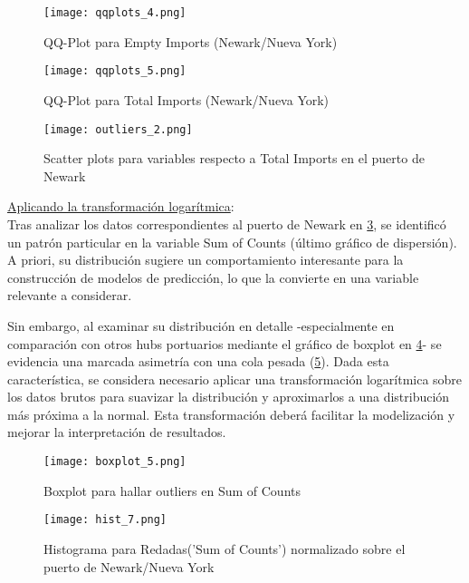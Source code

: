 \documentclass[12pt]{article}
\begin{document}
		\begin{figure}[H]
			\caption{\label{qqplots_4} QQ-Plot para Empty Imports (Newark/Nueva York)}
			\centering
			\hspace*{1cm}
			\texttt{[image: qqplots\_4.png]}
		\end{figure}
	
		\begin{figure}[H]
			\caption{\label{qqplots_5} QQ-Plot para Total Imports (Newark/Nueva York)}
			\centering
			\hspace*{1cm}
			\texttt{[image: qqplots\_5.png]}
		\end{figure}
	
		\begin{figure}[H]
			\caption{\label{outliers_2} Scatter plots para variables respecto a Total Imports en el puerto de Newark}
			\centering
			\hspace*{1cm}
			\texttt{[image: outliers\_2.png]}
		\end{figure}
	
		\underline{Aplicando la transformación logarítmica}:\\
		Tras analizar los datos correspondientes al puerto de Newark en \ref{outliers_2}, se identificó un patrón particular en la variable Sum of Counts (último gráfico de dispersión).
		A priori, su distribución sugiere un comportamiento interesante para la construcción de modelos de predicción, lo que la convierte en una variable relevante a considerar.
		
		Sin embargo, al examinar su distribución en detalle -especialmente en comparación con otros hubs portuarios mediante el gráfico de boxplot en \ref{boxplot_5}- se evidencia una marcada asimetría con una cola pesada (\ref{hist_7}). Dada esta característica, se considera necesario aplicar una transformación logarítmica sobre los datos brutos para suavizar la distribución y aproximarlos a una distribución más próxima a la normal. Esta transformación deberá facilitar la modelización y mejorar la interpretación de resultados.
		
		\begin{figure}[H]
			\caption{\label{boxplot_5} Boxplot para hallar outliers en Sum of Counts}
			\centering
			\hspace*{1cm}
			\texttt{[image: boxplot\_5.png]}
		\end{figure}
		
		\begin{figure}[H]
			\caption{\label{hist_7} Histograma para Redadas('Sum of Counts') normalizado sobre el puerto de Newark/Nueva York}
			\centering
			\hspace*{1cm}
			\texttt{[image: hist\_7.png]}
		\end{figure}
		
\end{document}
